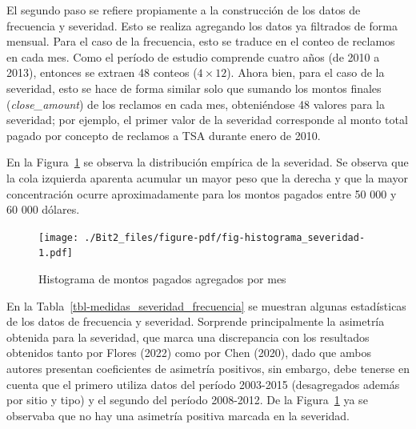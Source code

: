 \documentclass[
  letterpaper,
  onepage,
  openany]{scrreprt}
\begin{document}
El segundo paso se refiere propiamente a la construcción de los datos de
frecuencia y severidad. Esto se realiza agregando los datos ya filtrados
de forma mensual. Para el caso de la frecuencia, esto se traduce en el
conteo de reclamos en cada mes. Como el período de estudio comprende
cuatro años (de 2010 a 2013), entonces se extraen 48 conteos
(\(4\times 12\)). Ahora bien, para el caso de la severidad, esto se hace
de forma similar solo que sumando los montos finales
(\emph{close\_amount}) de los reclamos en cada mes, obteniéndose 48
valores para la severidad; por ejemplo, el primer valor de la severidad
corresponde al monto total pagado por concepto de reclamos a TSA durante
enero de 2010.

En la Figura~\ref{fig-histograma_severidad} se observa la distribución
empírica de la severidad. Se observa que la cola izquierda aparenta
acumular un mayor peso que la derecha y que la mayor concentración
ocurre aproximadamente para los montos pagados entre 50 000 y 60 000
dólares.

\begin{figure}[H]

\caption{\label{fig-histograma_severidad}Histograma de montos pagados
agregados por mes}

{\centering \texttt{[image: ./Bit2\_files/figure-pdf/fig-histograma\_severidad-1.pdf]}

}

\end{figure}

En la Tabla~\ref{tbl-medidas_severidad_frecuencia} se muestran algunas
estadísticas de los datos de frecuencia y severidad. Sorprende
principalmente la asimetría obtenida para la severidad, que marca una
discrepancia con los resultados obtenidos tanto por Flores (2022) como
por Chen (2020), dado que ambos autores presentan coeficientes de
asimetría positivos, sin embargo, debe tenerse en cuenta que el primero
utiliza datos del período 2003-2015 (desagregados además por sitio y
tipo) y el segundo del período 2008-2012. De la
Figura~\ref{fig-histograma_severidad} ya se observaba que no hay una
asimetría positiva marcada en la severidad.
\end{document}
